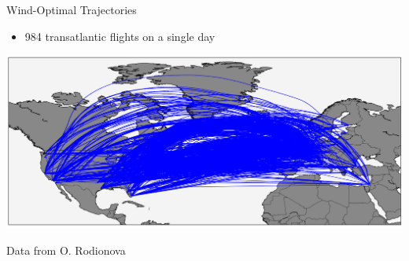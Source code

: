 \documentclass[10pt]{beamer}
\begin{document}
\begin{frame}[t]{Wind-Optimal Trajectories}
    \begin{itemize}
        \item 984 transatlantic flights on a single day
    \end{itemize}
    \begin{center}
        \includegraphics[width=1.0\textwidth]{images/wind_optimal_trajectories.png}
    \end{center}
    \vspace{-0.6cm}
    \hfill \tiny{Data from O. Rodionova}
\end{frame}
\end{document}
